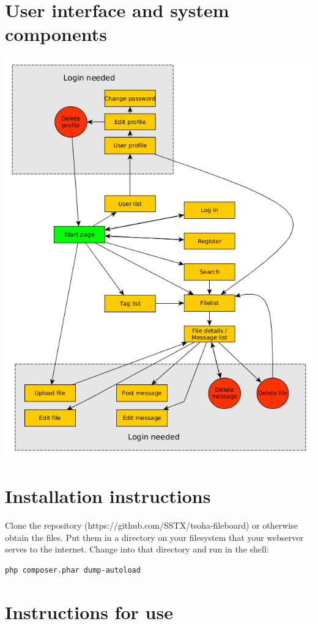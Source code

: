 \documentclass[10pt,a4paper]{article}
\begin{document}
\section{User interface and system components}
\includegraphics[scale=0.65]{diagrams/pageflow.png}

\section{Installation instructions}
Clone the repository (https://github.com/SSTX/tsoha-fileboard) or otherwise obtain the files. Put them in a directory on your filesystem that your webserver serves to the internet. Change into that directory and run in the shell:
\begin{lstlisting}
php composer.phar dump-autoload
\end{lstlisting}


\section{Instructions for use}
\end{document}
